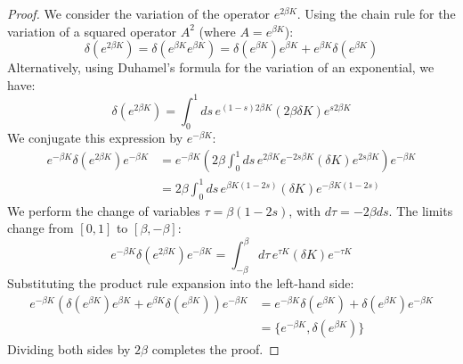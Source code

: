 \documentclass[a4paper,11pt]{article}
\theoremstyle{definition}
\begin{document}
\begin{proof}
We consider the variation of the operator $e^{2\beta K}$. Using the chain rule for the variation of a squared operator $A^2$ (where $A=e^{\beta K}$):
\begin{equation}
    \delta(e^{2\beta K}) = \delta \left( e^{\beta K} e^{\beta K} \right) = \delta(e^{\beta K}) e^{\beta K} + e^{\beta K} \delta(e^{\beta K})
\end{equation}
Alternatively, using Duhamel's formula for the variation of an exponential, we have:
\begin{equation}
    \delta(e^{2\beta K}) = \int_0^1 ds \, e^{(1-s)2\beta K} (2\beta \delta K) e^{s 2\beta K}
\end{equation}
We conjugate this expression by $e^{-\beta K}$:
\begin{align}
    e^{-\beta K} \delta(e^{2\beta K}) e^{-\beta K} &= e^{-\beta K} \left( 2\beta \int_0^1 ds \, e^{2\beta K} e^{-2s \beta K} (\delta K) e^{2s \beta K} \right) e^{-\beta K} \nonumber \\
    &= 2\beta \int_0^1 ds \, e^{\beta K(1-2s)} (\delta K) e^{-\beta K(1-2s)}
\end{align}
We perform the change of variables $\tau = \beta(1-2s)$, with $d\tau = -2\beta ds$. The limits change from $[0, 1]$ to $[\beta, -\beta]$:
\begin{equation}
    e^{-\beta K} \delta(e^{2\beta K}) e^{-\beta K} = \int_{-\beta}^{\beta} d\tau \, e^{\tau K} (\delta K) e^{-\tau K}
\end{equation}
Substituting the product rule expansion into the left-hand side:
\begin{align}
    e^{-\beta K} \left( \delta(e^{\beta K}) e^{\beta K} + e^{\beta K} \delta(e^{\beta K}) \right) e^{-\beta K} &= e^{-\beta K} \delta(e^{\beta K}) + \delta(e^{\beta K}) e^{-\beta K} \nonumber \\
    &= \{ e^{-\beta K}, \delta(e^{\beta K}) \}
\end{align}
Dividing both sides by $2\beta$ completes the proof.
\end{proof}
\end{document}
